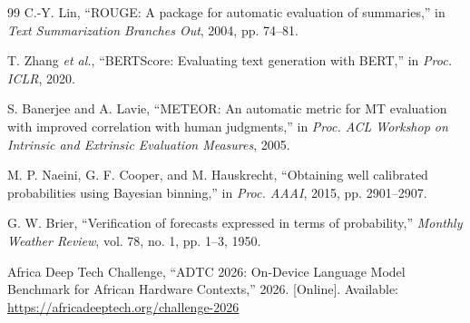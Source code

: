 \documentclass[conference]{IEEEtran}
\begin{document}
\begin{thebibliography}{99}
C.-Y. Lin,
``ROUGE: A package for automatic evaluation of summaries,''
in \textit{Text Summarization Branches Out}, 2004, pp. 74--81.

T. Zhang \textit{et al.},
``BERTScore: Evaluating text generation with BERT,''
in \textit{Proc. ICLR}, 2020.

S. Banerjee and A. Lavie,
``METEOR: An automatic metric for MT evaluation with improved correlation with human judgments,''
in \textit{Proc. ACL Workshop on Intrinsic and Extrinsic Evaluation Measures}, 2005.

M. P. Naeini, G. F. Cooper, and M. Hauskrecht,
``Obtaining well calibrated probabilities using Bayesian binning,''
in \textit{Proc. AAAI}, 2015, pp. 2901--2907.

G. W. Brier,
``Verification of forecasts expressed in terms of probability,''
\textit{Monthly Weather Review}, vol. 78, no. 1, pp. 1--3, 1950.

Africa Deep Tech Challenge, ``ADTC 2026: On-Device Language Model
Benchmark for African Hardware Contexts,'' 2026.
[Online]. Available: \url{https://africadeeptech.org/challenge-2026}

\end{thebibliography}
\end{document}
